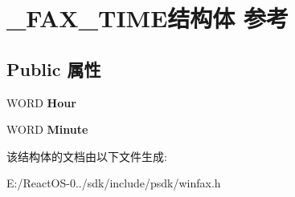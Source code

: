 \hypertarget{struct___f_a_x___t_i_m_e}{}\section{\+\_\+\+F\+A\+X\+\_\+\+T\+I\+M\+E结构体 参考}
\label{struct___f_a_x___t_i_m_e}
\subsection*{Public 属性}
\begin{DoxyCompactItemize}
\item 
\mbox{\label{struct___f_a_x___t_i_m_e_a8011be682007c88bfe081cc1003223d2}} 
W\+O\+RD {\bfseries Hour}
\item 
\mbox{\label{struct___f_a_x___t_i_m_e_a51665fe6e6a59e89e30e322be714ac02}} 
W\+O\+RD {\bfseries Minute}
\end{DoxyCompactItemize}


该结构体的文档由以下文件生成\+:\begin{DoxyCompactItemize}
\item 
E\+:/\+React\+O\+S-\/0../sdk/include/psdk/winfax.\+h\end{DoxyCompactItemize}
